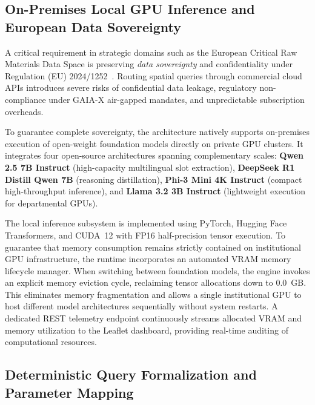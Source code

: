 \subsection{On-Premises Local GPU Inference and European Data Sovereignty}
\label{subsec:DataSovereignty}

A critical requirement in strategic domains such as the European Critical Raw Materials Data Space is preserving \textit{data sovereignty} and confidentiality under Regulation (EU) 2024/1252~\cite{european2024crma, ballatore2014vocabulary}. Routing spatial queries through commercial cloud APIs introduces severe risks of confidential data leakage, regulatory non-compliance under GAIA-X air-gapped mandates, and unpredictable subscription overheads.

To guarantee complete sovereignty, the architecture natively supports on-premises execution of open-weight foundation models directly on private GPU clusters. It integrates four open-source architectures spanning complementary scales: \textbf{Qwen 2.5 7B Instruct} (high-capacity multilingual slot extraction), \textbf{DeepSeek R1 Distill Qwen 7B} (reasoning distillation), \textbf{Phi-3 Mini 4K Instruct} (compact high-throughput inference), and \textbf{Llama 3.2 3B Instruct} (lightweight execution for departmental GPUs).

The local inference subsystem is implemented using PyTorch, Hugging Face Transformers, and CUDA~12 with FP16 half-precision tensor execution. To guarantee that memory consumption remains strictly contained on institutional GPU infrastructure, the runtime incorporates an automated VRAM memory lifecycle manager. When switching between foundation models, the engine invokes an explicit memory eviction cycle, reclaiming tensor allocations down to 0.0~GB. This eliminates memory fragmentation and allows a single institutional GPU to host different model architectures sequentially without system restarts. A dedicated REST telemetry endpoint continuously streams allocated VRAM and memory utilization to the Leaflet dashboard, providing real-time auditing of computational resources.

\subsection{Deterministic Query Formalization and Parameter Mapping}
\label{subsec:QueryFormalization}

